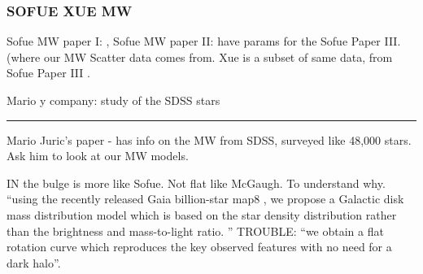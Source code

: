 \documentclass[reprint,%
 amsmath,amssymb,
 aps,
]{revtex4-1}
\begin{document}
 \subsubsection{SOFUE XUE MW}
 Sofue MW paper I: \cite{sofue2009unified}, 
 Sofue MW paper II: \cite{10.1093/pasj/61.2.153}
 have params for the Sofue Paper III. (where our MW Scatter data comes from. 
 Xue is a subset of same data, from Sofue Paper III \cite{Sof11}.
  
 




Mario y company: study of the SDSS stars
\cite{2010ApJ...716....1B}

{\color{teal} \rule{\linewidth}{0.5mm}}


 





\cite{2008ApJ...673..864J} Mario Juric's paper - has info  on the MW from SDSS, surveyed like 48,000 stars. Ask him to look at our MW models. 


 

IN \cite{Li2016ModellingMD} the bulge is more like Sofue. Not flat like McGaugh. 
To understand why. 
``using the recently released Gaia billion-star map8
, we propose a
Galactic disk mass distribution model which is based on the star density distribution
rather than the brightness and mass-to-light ratio. ''
TROUBLE: ``we obtain a flat rotation curve
which reproduces the key observed features with no need for a dark halo''.
\end{document}

